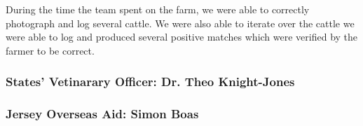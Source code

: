 During the time the team spent on the farm, we were able to correctly photograph and log several cattle. We were also able to iterate over the cattle we were able to log and produced several positive matches which were verified by the farmer to be correct.

\subsubsection{States' Vetinarary Officer: Dr. Theo Knight-Jones}


\subsubsection{Jersey Overseas Aid: Simon Boas}

